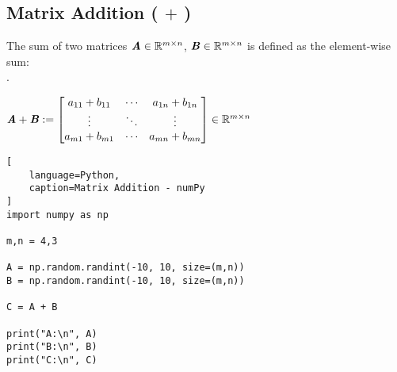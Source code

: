 \subsection{Matrix Addition ( $+$ )  \cite{mfml/book/mml/Deisenroth-Faisal-Ong}}

The sum of two matrices $\text{\textbf{\textit{A}}} \in \mathbb{R}^{m\times n}$, $\text{\textbf{\textit{B}}} \in \mathbb{R}^{m\times n}$ is defined as the element-wise sum:\\
. \hfill
\begin{customArrayStretch}{2}
$
    \text{\textbf{\textit{A}}} + \text{\textbf{\textit{B}}}
    := \begin{bmatrix}
        a_{11} + b_{11} &   \cdots  &  a_{1n} + b_{1n} \\
        \vdots          &   \ddots  &   \vdots  \\
        a_{m1} + b_{m1} &   \cdots  &  a_{mn} + b_{mn} \\
    \end{bmatrix}
    \in \mathbb{R}^{m\times n}
$
\end{customArrayStretch}
\hfill \cite{mfml/book/mml/Deisenroth-Faisal-Ong}







\begin{lstlisting}[
    language=Python,
    caption=Matrix Addition - numPy
]
import numpy as np

m,n = 4,3

A = np.random.randint(-10, 10, size=(m,n))
B = np.random.randint(-10, 10, size=(m,n))

C = A + B

print("A:\n", A)
print("B:\n", B)
print("C:\n", C)
\end{lstlisting}








